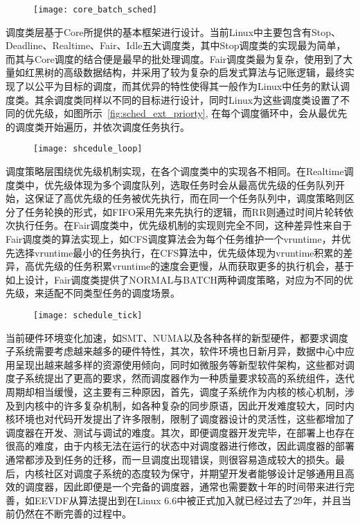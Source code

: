 \begin{figure}[!htbp]
    \centering
    \texttt{[image: core\_batch\_sched]}
    \label{fig:core_batch_sched}
\end{figure}

调度类层基于Core所提供的基本框架进行设计。当前Linux中主要包含有Stop、Deadline、Realtime、Fair、Idle五大调度类\citep{scheduler}，其中Stop调度类的实现最为简单，而其与Core调度的结合便是最早的批处理调度。Fair调度类最为复杂，使用到了大量如红黑树的高级数据结构，并采用了较为复杂的启发式算法与记账逻辑，最终实现了以公平为目标的调度，而其优异的特性使得其一般作为Linux中任务的默认调度类。其余调度类同样以不同的目标进行设计，同时Linux为这些调度类设置了不同的优先级，如图所示~\ref{fig:sched_ext_priorty}, 在每个调度循环中，会从最优先的调度类开始遍历，并依次调度任务执行。

\begin{figure}[!htbp]
    \centering 
    \texttt{[image: shcedule\_loop]}
    \label{fig:shcedule_loop}
\end{figure}

调度策略层围绕优先级机制实现，在各个调度类中的实现各不相同。在Realtime调度类中，优先级体现为多个调度队列，选取任务时会从最高优先级的任务队列开始，这保证了高优先级的任务被优先执行，而在同一个任务队列中，调度策略则区分了任务轮换的形式，如FIFO采用先来先执行的逻辑，而RR则通过时间片轮转依次执行任务。在Fair调度类中，优先级机制的实现则完全不同，这种差异性来自于Fair调度类的算法实现上，如CFS调度算法会为每个任务维护一个vruntime，并优先选择vruntime最小的任务执行，在CFS算法中，优先级体现为vruntime积累的差异，高优先级的任务积累vruntime的速度会更慢，从而获取更多的执行机会，基于如上设计，Fair调度类提供了NORMAL与BATCH两种调度策略，对应为不同的优先级，来适配不同类型任务的调度场景。

\begin{figure}[!htbp]
    \centering
    \texttt{[image: schedule\_tick]}
    \label{fig:schedule_tick}
\end{figure}

当前硬件环境变化加速，如SMT、NUMA以及各种各样的新型硬件，都要求调度子系统需要考虑越来越多的硬件特性，其次，软件环境也日新月异，数据中心中应用呈现出越来越多样的资源使用倾向，同时如微服务等新型软件架构，这些都对调度子系统提出了更高的要求，然而调度器作为一种质量要求较高的系统组件，迭代周期却相当缓慢，这主要有三种原因，首先，调度子系统作为内核的核心机制，涉及到内核中的许多复杂机制，如各种复杂的同步原语，因此开发难度较大，同时内核环境也对代码开发提出了许多限制，限制了调度器设计的灵活性，这些都增加了调度器在开发、测试与调试的难度\citep{humphries2021ghost}。其次，即便调度器开发完毕，在部署上也存在很高的难度，由于内核无法在运行的状态中对调度器进行修改，因此调度器的部署通常都涉及到任务的迁移，而一旦调度出现错误，则很容易造成较大的损失。最后，内核社区对调度子系统的态度较为保守，并期望开发者能够设计足够通用且高效的调度器，因此即便是一个完备的调度器，通常也需要数十年的时间带来进行完善\citep{agache2020firecracker}，如EEVDF从算法提出到在Linux 6.6中被正式加入就已经过去了29年，并且当前仍然在不断完善的过程中。

